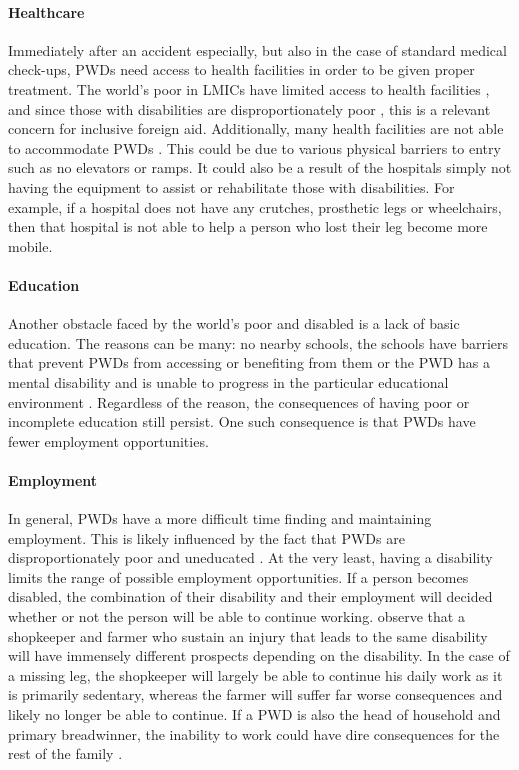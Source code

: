 \documentclass[a4paper]{article}
\begin{document}
\paragraph{Healthcare}

Immediately after an accident especially, but also in the case of standard
medical check-ups, PWDs need access to health facilities in order to be given
proper treatment. The world's poor in LMICs have limited access to health
facilities \citep{peters2008poverty}, and since those with disabilities are
disproportionately poor \citep{mitra2018disability}, this is a relevant
concern for inclusive foreign aid. Additionally, many health facilities are
not able to accommodate PWDs \citep{drainoni2006cross}. This could be due to
various physical barriers to entry such as no elevators or ramps. It could
also be a result of the hospitals simply not having the equipment to assist or
rehabilitate those with disabilities. For example, if a hospital does not have
any crutches, prosthetic legs or wheelchairs, then that hospital is not able
to help a person who lost their leg become more mobile.

\paragraph{Education}

Another obstacle faced by the world’s poor and disabled is a lack of basic
education. The reasons can be many: no nearby schools, the schools have
barriers that prevent PWDs from accessing or benefiting from them or the PWD
has a mental disability and is unable to progress in the particular
educational environment \citep{ingstad2011disability}. Regardless of the
reason, the consequences of having poor or incomplete education still persist.
One such consequence is that PWDs have fewer employment opportunities.

\paragraph{Employment}

In general, PWDs have a more difficult time finding and maintaining
employment. This is likely influenced by the fact that PWDs are
disproportionately poor and uneducated \citep{lamichhane2014nexus}. At the
very least, having a disability limits the range of possible employment
opportunities. If a person becomes disabled, the combination of their
disability and their employment will decided whether or not the person will be
able to continue working. \cite{chowdhury2006economics} observe that a
shopkeeper and farmer who sustain an injury that leads to the same disability
will have immensely different prospects depending on the disability. In the
case of a missing leg, the shopkeeper will largely be able to continue his
daily work as it is primarily sedentary, whereas the farmer will suffer far
worse consequences and likely no longer be able to continue. If a PWD is also
the head of household and primary breadwinner, the inability to work could
have dire consequences for the rest of the family \citep{world2011world}.
\end{document}
